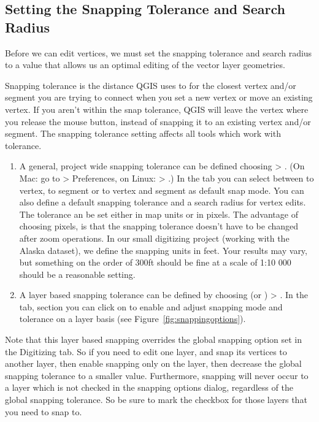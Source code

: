 \subsection{Setting the Snapping Tolerance and Search Radius}\label{snapping_tolerance}

Before we can edit vertices, we must set the snapping
tolerance and search radius to a value that allows us an optimal editing of
the vector layer geometries. 


Snapping tolerance is the distance QGIS uses to  for the
closest vertex and/or segment you are trying to
connect when you set a new vertex or move an existing vertex. If you aren't
within the snap tolerance, QGIS will leave the vertex where you release the
mouse button, instead of snapping it to an existing vertex and/or segment. 
The snapping tolerance setting affects all tools which work with tolerance. 

\begin{enumerate}
\item A general, project wide snapping tolerance can be defined choosing
 > . 
(On Mac: go to   > Preferences, on Linux:  > .)
In the  tab you can select between to vertex, to segment or
to vertex and segment as default snap mode. You can also define a default
snapping tolerance and a search radius for vertex edits. The tolerance an be 
set either in map units or in pixels. The advantage of choosing pixels, is 
that the snapping tolerance doesn't have to be changed after zoom operations. 
In our small digitizing project (working with the Alaska dataset), we define 
the snapping units in feet. Your results may vary, but something on the order 
of 300ft should be fine at a scale of 1:10 000 should be a reasonable 
setting.
\item A layer based snapping tolerance can be defined by choosing
 (or ) > . In the  tab, section  you
can click on  to enable and adjust snapping
mode and tolerance on a layer basis (see Figure~\ref{fig:snappingoptions}).
\end{enumerate}
Note that this layer based snapping overrides the global snapping option set in the Digitizing tab. So if you need to edit one layer, and snap its vertices to another layer, then enable snapping only on the  layer, then decrease the global snapping tolerance to a smaller value.  Furthermore, snapping will never occur to a layer which is not checked in the snapping options dialog, regardless of the global snapping tolerance. So be sure to mark the checkbox for those layers that you need to snap to.

